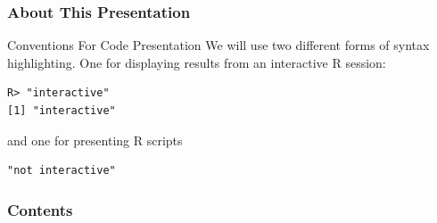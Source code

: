 \begin{frame}[fragile]
\frametitle{About This Presentation}
 \begin{block}{Conventions For Code Presentation}
We will use two different forms of syntax highlighting.  One for displaying results from an interactive R session:
\begin{lstlisting}[backgroundcolor=\color{white},basicstyle=\ttfamily\color{dkgray}\scriptsize,keywordstyle=\color{black}, 
  commentstyle=\color{orange},stringstyle=\color{mauve}]
R> "interactive"
[1] "interactive"
\end{lstlisting}
and one for presenting R scripts
\begin{lstlisting}
"not interactive"
\end{lstlisting}
 \end{block}
\end{frame}



\begin{frame}
\frametitle{Contents}
\small
\tableofcontents[hideallsubsections]
\end{frame}

\setcounter{framenumber}{0}
